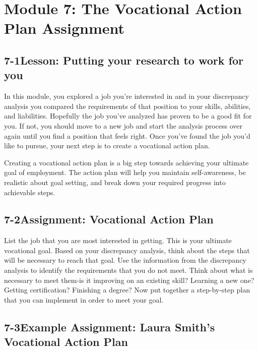 \pagebreak \section*{Module 7:	The Vocational Action Plan Assignment}
\noindent\makebox[\textwidth]{\rule{\linewidth}{0.4pt}}
\localtableofcontents
\noindent\makebox[\textwidth]{\rule{\linewidth}{0.4pt}}


\pagebreak \subsection*{7-1\quad Lesson: Putting your research to work for you}
In this module, you explored a job you're interested in and in your discrepancy analysis you compared the requirements of that position to your skills, abilities, and liabilities. Hopefully the job you've analyzed has proven to be a good fit for you. If not, you should move to a new job and start the analysis process over again until you find a position that feels right. Once you've found the job you'd like to pursue, your next step is to create a vocational action plan.

Creating a vocational action plan is a big step towards achieving your ultimate goal of employment. The action plan will help you maintain self-awareness, be realistic about goal setting, and break down your required progress into achievable steps.

\pagebreak \subsection*{7-2\quad Assignment: Vocational Action Plan}
List the job that you are most interested in getting. This is your ultimate vocational goal. Based on your discrepancy analysis, think about the steps that will be necessary to reach that goal. Use the information from the discrepancy analysis to identify the requirements that you do not meet. Think about what is necessary to meet them-is it improving on an existing skill? Learning a new one? Getting certification? Finishing a degree? Now put together a step-by-step plan that you can implement in order to meet your goal.

\pagebreak \subsection*{7-3\quad Example Assignment: Laura Smith's Vocational Action Plan}
